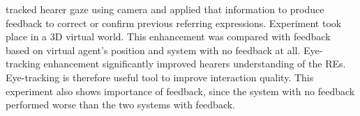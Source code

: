 \citet{koller2012enhancing} tracked hearer gaze using camera and applied that information to produce feedback to correct or confirm previous referring expressions. Experiment took place in a 3D virtual world. This enhancement was compared with feedback based on virtual agent's position and system with no feedback at all. Eye-tracking enhancement significantly improved hearers understanding of the REs. Eye-tracking is therefore useful tool to improve interaction quality. This experiment also shows importance of feedback, since the system with no feedback performed worse than the two systems with feedback.
